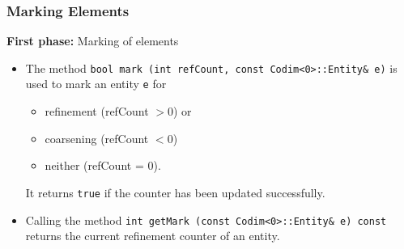 \begin{frame}
  \frametitle<presentation>{Marking Elements} 

  {\bf First phase:} {Marking of elements}
  \begin{itemize}
    \item The method\newline
      \lstinline{bool mark (int refCount, const Codim<0>::Entity& e)}\newline
      is used to mark an entity \lstinline{e} for 
      \begin{itemize}
        \item refinement (refCount $> 0$) or 
        \item coarsening (refCount $< 0$)
        \item neither (refCount = 0).
      \end{itemize}
      It returns \lstinline{true} if the counter has been updated
      successfully.
    \item  Calling the method\newline
      \lstinline{int getMark (const Codim<0>::Entity& e) const}\newline
      returns the current refinement counter of an entity.
  \end{itemize}
\end{frame}

